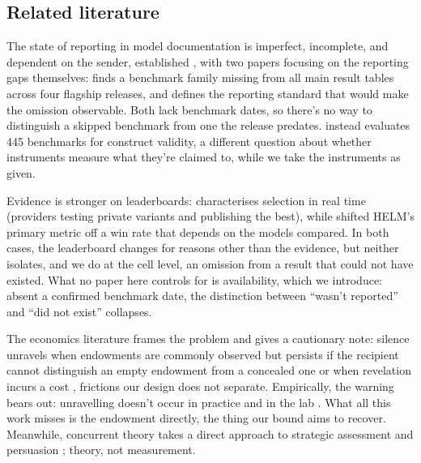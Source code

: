\subsection{Related literature}\label{sec:related}

The state of reporting in model documentation is imperfect, incomplete, and dependent on the sender, established \citep{staufer2025auditcards,kuehnert2026disclosure}, with two papers focusing on the reporting gaps themselves: \citet{zhang2026positional} finds a benchmark family missing from all main result tables across four flagship releases, and \citet{ghosh2026evalcards} defines the reporting standard that would make the omission observable. Both lack benchmark dates, so there's no way to distinguish a skipped benchmark from one the release predates. \citet{bean2025measuring} instead evaluates 445 benchmarks for construct validity, a different question about whether instruments measure what they're claimed to, while we take the instruments as given.

Evidence is stronger on leaderboards: \citet{singh2025leaderboard} characterises selection in real time (providers testing private variants and publishing the best), while \citet{xu2025capabilities} shifted HELM's primary metric off a win rate that depends on the models compared. In both cases, the leaderboard changes for reasons other than the evidence, but neither isolates, and we do at the cell level, an omission from a result that could not have existed. What no paper here controls for is availability, which we introduce: absent a confirmed benchmark date, the distinction between ``wasn't reported'' and ``did not exist'' collapses.

The economics literature frames the problem and gives a cautionary note: silence unravels when endowments are commonly observed \citep{grossman1981,milgrom1981} but persists if the recipient cannot distinguish an empty endowment from a concealed one \citep{dye1985,jung1988} or when revelation incurs a cost \citep{verrecchia1983}, frictions our design does not separate. Empirically, the warning bears out: unravelling doesn't occur in practice \citep{dranove2010,jin2003,hotz2013,bederson2018} and in the lab \citep{jinluca2021}. What all this work misses is the endowment directly, the thing our bound aims to recover. Meanwhile, concurrent theory takes a direct approach to strategic assessment and persuasion \citep{truong2026strategic,dai2026persuasion}; theory, not measurement.

